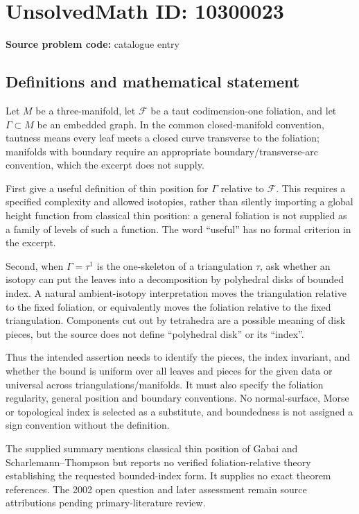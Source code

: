 \documentclass[11pt]{article}
\begin{document}
\section*{UnsolvedMath ID: 10300023}
\textbf{Source problem code:} catalogue entry
\subsection{Definitions and mathematical statement}
Let \(M\) be a three-manifold, let \(\mathscr F\) be a taut codimension-one foliation, and let \(\Gamma\subset M\) be an embedded graph. In the common closed-manifold convention, tautness means every leaf meets a closed curve transverse to the foliation; manifolds with boundary require an appropriate boundary/transverse-arc convention, which the excerpt does not supply.

First give a useful definition of thin position for \(\Gamma\) relative to \(\mathscr F\). This requires a specified complexity and allowed isotopies, rather than silently importing a global height function from classical thin position: a general foliation is not supplied as a family of levels of such a function. The word ``useful'' has no formal criterion in the excerpt.

Second, when \(\Gamma=\tau^1\) is the one-skeleton of a triangulation \(\tau\), ask whether an isotopy can put the leaves into a decomposition by polyhedral disks of bounded index. A natural ambient-isotopy interpretation moves the triangulation relative to the fixed foliation, or equivalently moves the foliation relative to the fixed triangulation. Components cut out by tetrahedra are a possible meaning of disk pieces, but the source does not define ``polyhedral disk'' or its ``index''.

Thus the intended assertion needs to identify the pieces, the index invariant, and whether the bound is uniform over all leaves and pieces for the given data or universal across triangulations/manifolds. It must also specify the foliation regularity, general position and boundary conventions. No normal-surface, Morse or topological index is selected as a substitute, and boundedness is not assigned a sign convention without the definition.

The supplied summary mentions classical thin position of Gabai and Scharlemann--Thompson but reports no verified foliation-relative theory establishing the requested bounded-index form. It supplies no exact theorem references. The 2002 open question and later assessment remain source attributions pending primary-literature review.
\end{document}
